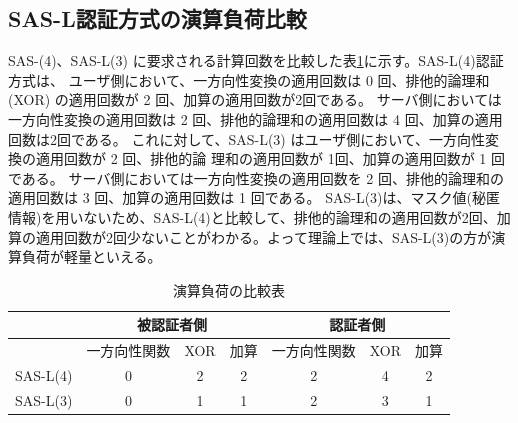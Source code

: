 \documentclass{thesis}
\begin{document}
\subsection{SAS-L認証方式の演算負荷比較}
SAS-(4)、SAS-L(3) に要求される計算回数を比較した表\ref{tb2}に示す。SAS-L(4)認証方式は、
ユーザ側において、一方向性変換の適用回数は 0 回、排他的論理和 (XOR) の適用回数が 2
回、加算の適用回数が2回である。
サーバ側においては一方向性変換の適用回数は 2 回、排他的論理和の適用回数は 4 回、加算の適用回数は2回である。
これに対して、SAS-L(3) はユーザ側において、一方向性変換の適用回数が 2 回、排他的論
理和の適用回数が 1回、加算の適用回数が 1 回である。
サーバ側においては一方向性変換の適用回数を 2 回、排他的論理和の適用回数は 3 回、加算の適用回数は 1 回である。
SAS-L(3)は、マスク値(秘匿情報)を用いないため、SAS-L(4)と比較して、排他的論理和の適用回数が2回、加算の適用回数が2回少ないことがわかる。よって理論上では、SAS-L(3)の方が演算負荷が軽量といえる。

		\begin{table}[H]
			\begin{center}
				\caption{演算負荷の比較表}
				\label{tb2} %
				\begin{tabular}{|l|c|c|c|c|c|c|}
					\hline
				   		& \multicolumn{3}{c|}{\textbf{被認証者側}}                                               & \multicolumn{3}{c|}{\textbf{認証者側}}                                               \\ \hline
				   		& \multicolumn{1}{l|}{一方向性関数} & \multicolumn{1}{l|}{XOR} & \multicolumn{1}{l|}{加算} & \multicolumn{1}{l|}{一方向性関数} & \multicolumn{1}{l|}{XOR} & \multicolumn{1}{l|}{加算} \\ \hline
					SAS-L(4) & 0                           & 2                        & 2                       & 2                           & 4                        & 2                       \\ \hline
					SAS-L(3) & 0                           & 1                        & 1                       & 2                           & 3                        & 1                       \\ \hline
				\end{tabular}
			\end{center}
		\end{table}


\end{document}
